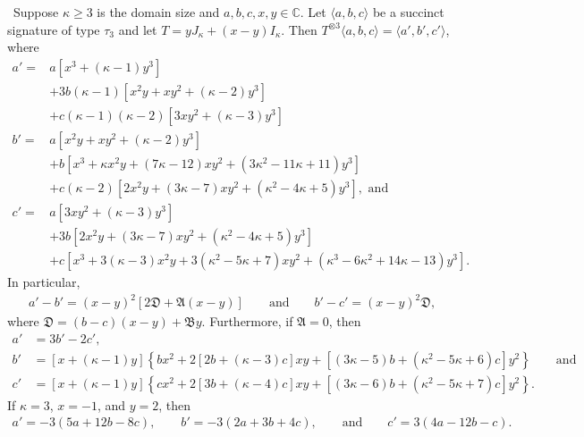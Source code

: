 \documentclass[11pt]{article}
\begin{document}
\begin{lemma} \label{lem:compute:ternary:holographic_transformation}\
 Suppose $\kappa \ge 3$ is the domain size and $a,b,c,x,y \in \mathbb{C}$.
 Let $\langle a,b,c \rangle$ be a succinct signature of type $\tau_3$ and let $T = y J_\kappa + (x - y) I_\kappa$.
 Then $T^{\otimes 3} \langle a,b,c \rangle = \langle a',b',c' \rangle$,
 where
 \begin{align*}
  a' = {}&a \left[x^3 + (\kappa - 1) y^3\right]\\
       {}&+ 3 b (\kappa - 1) \left[x^2 y + x y^2 + (\kappa - 2) y^3\right]\\
       {}&+ c (\kappa - 1) (\kappa - 2) \left[3 x y^2 + (\kappa - 3) y^3\right]\\
  b' = {}&a \left[x^2 y + x y^2 + (\kappa - 2) y^3\right]\\
       {}&+ b \left[x^3 + \kappa x^2 y + (7 \kappa - 12) x y^2 + (3 \kappa^2 - 11 \kappa + 11) y^3\right]\\
       {}&+ c (\kappa - 2) \left[2 x^2 y + (3 \kappa - 7) x y^2 + (\kappa^2 - 4 \kappa + 5) y^3\right], \text{ and}\\
  c' = {}&a \left[3 x y^2 + (\kappa - 3) y^3\right]\\
       {}&+ 3 b \left[2 x^2 y + (3 \kappa - 7) x y^2 + (\kappa^2 - 4 \kappa + 5) y^3\right]\\
       {}&+ c \left[x^3 + 3 (\kappa - 3) x^2 y + 3 (\kappa^2 - 5 \kappa + 7) x y^2 + (\kappa^3 - 6 \kappa^2 + 14 \kappa - 13) y^3\right].
 \end{align*}
 In particular,
 \begin{align*}
  a' - b' = (x - y)^2 [2 \mathfrak{D} + \mathfrak{A} (x - y)]
            \qquad \text{and} \qquad
  b' - c' = (x - y)^2 \mathfrak{D},
 \end{align*}
 where $\mathfrak{D} = (b - c) (x - y) + \mathfrak{B} y$.
 Furthermore, if $\mathfrak{A} = 0$, then
 \begin{align*}
  a' &= 3 b' - 2 c',\\
  b' &= [x + (\kappa - 1) y]
        \left\{
           b x^2
         + 2 [2 b + (\kappa - 3) c] x y
         + [(3 \kappa - 5) b + (\kappa^2 - 5 \kappa + 6) c] y^2
        \right\}
        \qquad \text{and}\\
  c' &= [x + (\kappa - 1) y]
        \left\{
           c x^2
         + 2 [3 b + (\kappa - 4) c] x y
         + [(3 \kappa - 6) b + (\kappa^2 - 5 \kappa + 7) c] y^2
        \right\}.
 \end{align*}
 If $\kappa = 3$, $x = -1$, and $y = 2$, then
 \begin{align*}
  a' =  -3 (5 a + 12 b - 8 c),
        \qquad
  b' =  -3 (2 a +  3 b + 4 c),
        \qquad
        \text{and}
        \qquad
  c' = 3 (4 a - 12 b - c).
 \end{align*}
\end{lemma}
\end{document}
